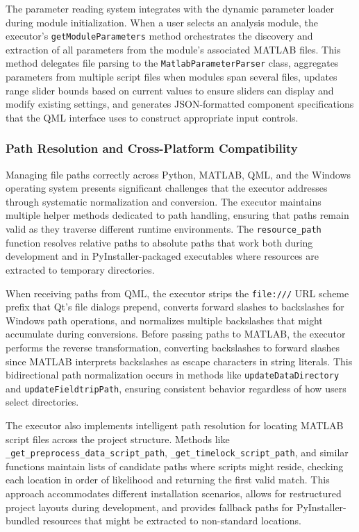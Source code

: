 \documentclass[12pt]{report}
\begin{document}
The parameter reading system integrates with the dynamic parameter loader during module initialization. When a user selects an analysis module, the executor's \verb|getModuleParameters| method orchestrates the discovery and extraction of all parameters from the module's associated MATLAB files. This method delegates file parsing to the \verb|MatlabParameterParser| class, aggregates parameters from multiple script files when modules span several files, updates range slider bounds based on current values to ensure sliders can display and modify existing settings, and generates JSON-formatted component specifications that the QML interface uses to construct appropriate input controls.

\subsubsection{Path Resolution and Cross-Platform Compatibility}

Managing file paths correctly across Python, MATLAB, QML, and the Windows operating system presents significant challenges that the executor addresses through systematic normalization and conversion. The executor maintains multiple helper methods dedicated to path handling, ensuring that paths remain valid as they traverse different runtime environments. The \verb|resource_path| function resolves relative paths to absolute paths that work both during development and in PyInstaller-packaged executables where resources are extracted to temporary directories.

When receiving paths from QML, the executor strips the \verb|file:///| URL scheme prefix that Qt's file dialogs prepend, converts forward slashes to backslashes for Windows path operations, and normalizes multiple backslashes that might accumulate during conversions. Before passing paths to MATLAB, the executor performs the reverse transformation, converting backslashes to forward slashes since MATLAB interprets backslashes as escape characters in string literals. This bidirectional path normalization occurs in methods like \verb|updateDataDirectory| and \verb|updateFieldtripPath|, ensuring consistent behavior regardless of how users select directories.

The executor also implements intelligent path resolution for locating MATLAB script files across the project structure. Methods like \verb|_get_preprocess_data_script_path|, \verb|_get_timelock_script_path|, and similar functions maintain lists of candidate paths where scripts might reside, checking each location in order of likelihood and returning the first valid match. This approach accommodates different installation scenarios, allows for restructured project layouts during development, and provides fallback paths for PyInstaller-bundled resources that might be extracted to non-standard locations.
\end{document}
